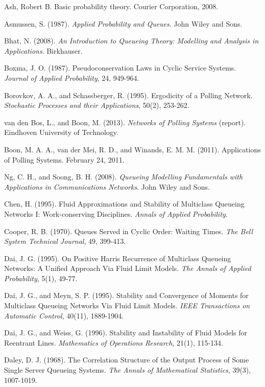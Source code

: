 \begin{thebibliography}{99}
Ash, Robert B. Basic probability theory. Courier Corporation, 2008.

 Asmussen, S. (1987). \textit{Applied Probability and Queues}. John Wiley and Sons.

 Bhat, N. (2008). \textit{An Introduction to Queueing Theory: Modelling and Analysis in Applications}. Birkhauser.

 Boxma, J. O. (1987). Pseudoconservation Laws in Cyclic Service Systems. \textit{Journal of Applied Probability}, 24, 949-964.

 Borovkov, A. A., and Schassberger, R. (1995). Ergodicity of a Polling Network. \textit{Stochastic Processes and their Applications}, 50(2), 253-262.

 van den Bos, L., and Boon, M. (2013). \textit{Networks of Polling Systems} (report). Eindhoven University of Technology.

 Boon, M. A. A., van der Mei, R. D., and Winands, E. M. M. (2011). Applications of Polling Systems. February 24, 2011.

 Ng, C. H., and Soong, B. H. (2008). \textit{Queueing Modelling Fundamentals with Applications in Communications Networks}. John Wiley and Sons.

 Chen, H. (1995). Fluid Approximations and Stability of Multiclass Queueing Networks I: Work-conserving Disciplines. \textit{Annals of Applied Probability}.

 Cooper, R. B. (1970). Queues Served in Cyclic Order: Waiting Times. \textit{The Bell System Technical Journal}, 49, 399-413.

 Dai, J. G. (1995). On Positive Harris Recurrence of Multiclass Queueing Networks: A Unified Approach Via Fluid Limit Models. \textit{The Annals of Applied Probability}, 5(1), 49-77.

 Dai, J. G., and Meyn, S. P. (1995). Stability and Convergence of Moments for Multiclass Queueing Networks Via Fluid Limit Models. \textit{IEEE Transactions on Automatic Control}, 40(11), 1889-1904.

 Dai, J. G., and Weiss, G. (1996). Stability and Instability of Fluid Models for Reentrant Lines. \textit{Mathematics of Operations Research}, 21(1), 115-134.

 Daley, D. J. (1968). The Correlation Structure of the Output Process of Some Single Server Queueing Systems. \textit{The Annals of Mathematical Statistics}, 39(3), 1007-1019.


\end{thebibliography}
